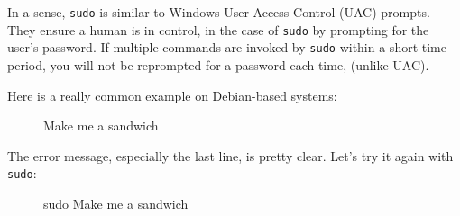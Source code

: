 \documentclass[10pt,american,]{book}
\newenvironment{Shaded}{\begin{snugshade}}{\end{snugshade}}
\newcommand{\KeywordTok}[1]{\textcolor[rgb]{0.13,0.29,0.53}{\textbf{{#1}}}}
\newcommand{\NormalTok}[1]{{#1}}
\numberwithin{figure}{chapter}
\DeclareRobustCommand{\drcap}[1]{\begin{figure}[H]\caption{#1}\end{figure}}
\renewcommand{\KeywordTok}[1]{{#1}}
\renewcommand{\NormalTok}[1]{{#1}}
\begin{document}
In a sense, \texttt{sudo} is similar to Windows User Access Control
(UAC) prompts. They ensure a human is in control, in the case of
\texttt{sudo} by prompting for the user's password. If multiple commands
are invoked by \texttt{sudo} within a short time period, you will not be
reprompted for a password each time, (unlike UAC).

Here is a really common example on Debian-based systems:

\drcap{Make me a sandwich}

\begin{Shaded}
\end{Shaded}

The error message, especially the last line, is pretty clear. Let's try
it again with \texttt{sudo}:

\drcap{sudo Make me a sandwich}
\end{document}
